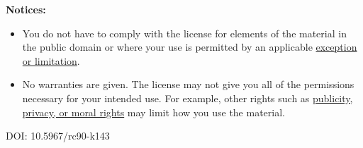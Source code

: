 \begin{flushleft}
\begin{small}
\textbf{Notices:}

\begin{itemize}
\tightlist
\item You do not have to comply with the license for elements of the material in the public domain or where your use is permitted by an applicable \href{https://creativecommons.org/licenses/by-nc-nd/4.0/?ref=chooser-v1#ref-exception-or-limitation}{exception or limitation}.\\
\item No warranties are given. The license may not give you all of the permissions necessary for your intended use. For example, other rights such as \href{https://creativecommons.org/licenses/by-nc-nd/4.0/?ref=chooser-v1#ref-publicity-privacy-or-moral-rights}{publicity, privacy, or moral rights} may limit how you use the material.
\end{itemize}

\vspace{5mm}
DOI: 10.5967/rc90-k143
\end{small}
\end{flushleft}

